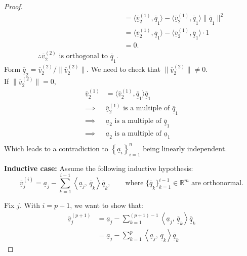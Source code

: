 \documentclass{article}
\newcommand{\mgs}[1] {\underline{\overline{#1}}}
\newcommand{\cgs}[1] {\underline{#1}}
\newcommand{\mgzz}[2] {\ensuremath{\underline{\overline{#1}}}_{#2}}
\newcommand{\mgz}[3] {\ensuremath{\underline{\overline{#1}}}_{#2}^{(#3)}}
\newcommand{\cgz}[2] {\ensuremath{\underline{#1}}_{#2}}
\newcommand{\brackit}[2] {\ensuremath{\left\langle #1,\,#2 \right\rangle}}
\begin{document}
\begin{enumerate}
\begin{proof}
\begin{align*}
		&= \langle \mgs{v}_2^{(1)}, \mgs{q}_1 \rangle - \langle \mgs{v}_2^{(1)}, \mgs{q}_1 \rangle  \|\mgs{q}_1\|^2 \\
		&= \langle \mgs{v}_2^{(1)}, \mgs{q}_1 \rangle - \langle \mgs{v}_2^{(1)}, \mgs{q}_1 \rangle \cdot 1 \\
		&= 0. \\
		\therefore \mgs{v}_2^{(2)} \text{ is orthogonal to } \mgs{q}_1.
	\end{align*}
	Form $\mgs{q}_2 = \mgs{v}_2^{(2)} / \| \mgs{v}_2^{(2)} \|$. We need to check that $\| \mgs{v}_2^{(2)} \| \neq 0$. \\
	If $\| \mgs{v}_2^{(2)}\| = 0 $, 
	\begin{align*}
	\mgs{v}_2^{(1)} &= \langle \mgs{v}_2^{(1)}, \mgs{q}_1 \rangle \mgs{q}_1 \\
	\implies &\mgs{v}_2^{(1)} \text{ is a multiple of } \mgs{q}_1 \\
	\implies &\cgs{a}_2 \text{ is a multiple of } \mgs{q}_1 \\ 
	\implies &\cgs{a}_2 \text{ is a multiple of } \cgs{a}_1 \\ 
	\end{align*}
	Which leads to a contradiction to $\left\{ \cgs{a}_i \right\}_{i=1}^n \text{ being linearly independent.}$
	
	\textbf{Inductive case:}
	Assume the following inductive hypothesis: 
	\begin{equation} \label{eq:indhyp}
		\mgz{v}{j}{i} = \cgz{a}{j} - \sum\limits_{k=1}^{i-1} \brackit{\cgz{a}{j}}{\mgzz{q}{k}}\mgzz{q}{k}, \qquad \text{where } \{ \mgzz{q}{k} \}_{k=1}^{i-1} \in \mathbb{R}^m \text{ are orthonormal.}
	\end{equation}

	Fix $j$. With $i = p + 1$, we want to show that:
	\begin{align*} \label{eq:indcase}
		\mgz{v}{j}{p+1} &= \cgz{a}{j} - \sum\limits_{k=1}^{(p+1)-1} \brackit{\cgz{a}{j}}{\mgzz{q}{k}}\mgzz{q}{k} \\
		&= \cgz{a}{j} - \sum\limits_{k=1}^{p} \brackit{\cgz{a}{j}}{\mgzz{q}{k}}\mgzz{q}{k}
	\end{align*}
	

\end{proof}
\end{enumerate}
\end{document}
